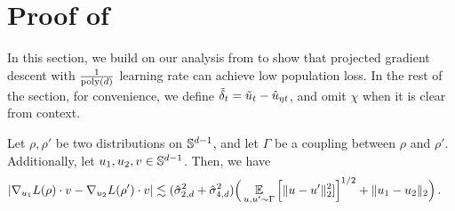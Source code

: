 \section{Proof of } \label{sec:projectedGD_smallLR}

In this section, we build on our analysis from  to show that projected gradient descent with $\frac{1}{\textup{poly}(d)}$ learning rate can achieve low population loss. In the rest of the section, for convenience, we define ${\tilde{\delta}}_t = \tilde{u}_t - \hat{u}_{\eta t}$, and omit $\chi$ when it is clear from context.

\begin{lemma} \label{lemma:gradient_expectation_inner_product}
Let $\rho, \rho'$ be two distributions on $\mathbb{S}^{d - 1}$, and let $\Gamma$ be a coupling between $\rho$ and $\rho'$. Additionally, let $u_1, u_2, v \in \mathbb{S}^{d - 1}$. Then, we have
\begin{align}
|\nabla_{u_1} L(\rho) \cdot v - \nabla_{u_2} L(\rho') \cdot v|
& \lesssim (\hat{\sigma}_{2, d}^2 + \hat{\sigma}_{4, d}^2) \Big(\operatorname*{\mathbb{E}}_{u, u' \sim \Gamma} \Big[\|u - u'\|_2^2] \Big]^{1/2} + \|u_1 - u_2\|_2 \Big) \,.
\end{align}
\end{lemma}
